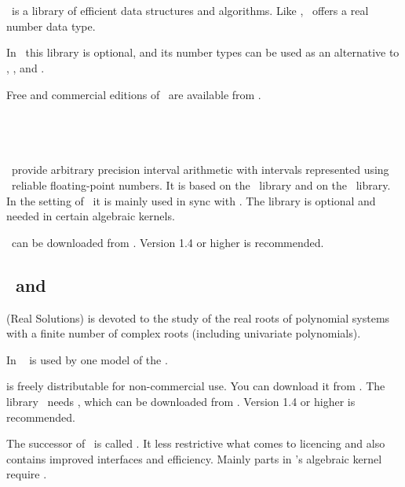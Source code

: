 \subsection{\leda\ \label{thirdparty:Leda}}

\leda\ is a library of efficient data structures and
algorithms. Like \core, \leda\ offers a real number data type.  

In \cgal\ this library is optional, and its number types can 
be used as an alternative to \gmp, \mpfr, and \core.

Free and commercial editions of \leda\ are available from \ledapage.

\subsection{\mpfi\ \label{thirdparty:MPFI}}

\mpfi\ provide arbitrary precision interval arithmetic with intervals 
represented using \mpfr\ reliable floating-point numbers. 
It is based on the \gmp\ library and on the \mpfr\ library.
In the setting of \cgal\ it is mainly used in sync with \rs. 
The library is optional and needed in certain algebraic
kernels.

\mpfi\ can be downloaded from \mpfipage. Version 1.4 or higher is recommended.

\subsection{\rs\ and \label{thirdparty:RS}\label{thirdparty:RS3}}

\rs{} (Real Solutions) is devoted to the study of the real
roots of polynomial systems with a finite number of complex roots
(including univariate polynomials). 

In \cgal\ \rs{} is used by one model of the .

\rs{} is freely distributable for non-commercial use. You can download it
from \rspage{}. The library \rs\ needs \mpfi, which can be downloaded from \mpfipage. 
Version 1.4 or higher is recommended.

The successor of \rs\ is called . It less restrictive what comes
to licencing and also contains improved interfaces and
efficiency. Mainly parts in \cgal's algebraic kernel require .

\subsection{\ntl \label{thirdparty:NTL}}

